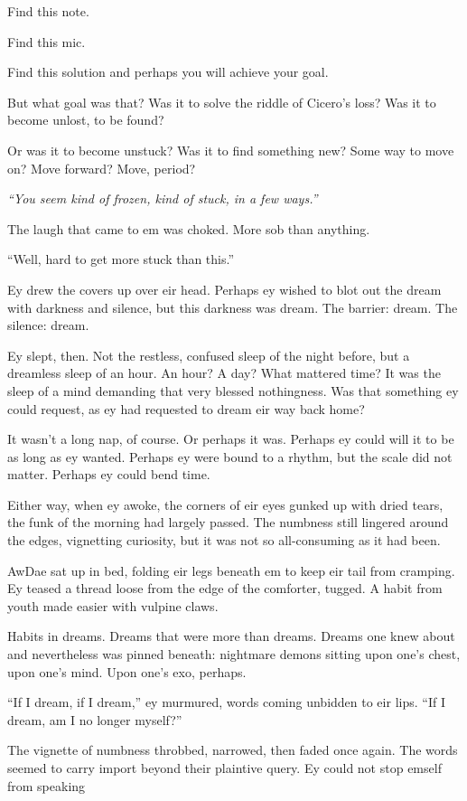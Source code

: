 Find this note.

Find this mic.

Find this solution and perhaps you will achieve your goal.

But what goal was that? Was it to solve the riddle of Cicero's loss? Was it to become unlost, to be found?

Or was it to become unstuck? Was it to find something new? Some way to move on? Move forward? Move, period?

\emph{``You seem kind of frozen, kind of stuck, in a few ways.''}

The laugh that came to em was choked. More sob than anything.

``Well, hard to get more stuck than this.''

Ey drew the covers up over eir head. Perhaps ey wished to blot out the dream with darkness and silence, but this darkness was dream. The barrier: dream. The silence: dream.

Ey slept, then. Not the restless, confused sleep of the night before, but a dreamless sleep of an hour. An hour? A day? What mattered time? It was the sleep of a mind demanding that very blessed nothingness. Was that something ey could request, as ey had requested to dream eir way back home?

It wasn't a long nap, of course. Or perhaps it was. Perhaps ey could will it to be as long as ey wanted. Perhaps ey were bound to a rhythm, but the scale did not matter. Perhaps ey could bend time.

Either way, when ey awoke, the corners of eir eyes gunked up with dried tears, the funk of the morning had largely passed. The numbness still lingered around the edges, vignetting curiosity, but it was not so all-consuming as it had been.

AwDae sat up in bed, folding eir legs beneath em to keep eir tail from cramping. Ey teased a thread loose from the edge of the comforter, tugged. A habit from youth made easier with vulpine claws.

Habits in dreams. Dreams that were more than dreams. Dreams one knew about and nevertheless was pinned beneath: nightmare demons sitting upon one's chest, upon one's mind. Upon one's exo, perhaps.

``If I dream, if I dream,'' ey murmured, words coming unbidden to eir lips. ``If I dream, am I no longer myself?''

The vignette of numbness throbbed, narrowed, then faded once again. The words seemed to carry import beyond their plaintive query. Ey could not stop emself from speaking

